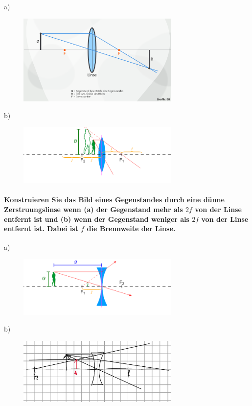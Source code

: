 \documentclass[a4paper, 11pt, ngerman, parskip=half]{scrartcl}
\begin{document}
a)
\begin{figure}[H]
    \centering
    \includegraphics[width=8cm]{image/17/geo15a}
\end{figure}



b)
\begin{figure}[H]
    \centering
    \includegraphics[width=8cm]{image/17/geo15b}
\end{figure}







\paragraph{Konstruieren Sie das Bild eines Gegenstandes durch eine dünne Zerstruungslinse wenn (a)
der Gegenstand mehr als $2f$ von der Linse entfernt ist und (b) wenn der Gegenstand weniger
als $2f$ von der Linse entfernt ist. Dabei ist $f$ die Brennweite der Linse.}


a)
\begin{figure}[H]
    \centering
    \includegraphics[width=8cm]{image/17/geo16a}
\end{figure}



b)
\begin{figure}[H]
    \centering
    \includegraphics[width=8cm]{image/17/geo16b}
\end{figure}
\end{document}
